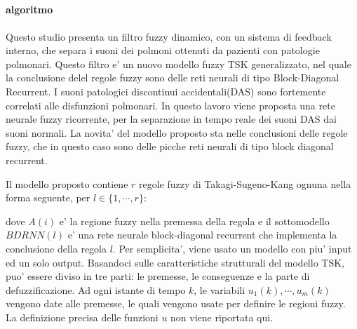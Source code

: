  

\subsection{\cite{ADFMFPLS}}

\paragraph{algoritmo}
Questo studio presenta un filtro fuzzy dinamico, con un sistema di feedback interno, che separa i suoni dei polmoni ottenuti da pazienti con patologie polmonari. Questo filtro e' un nuovo modello fuzzy TSK generalizzato, nel quale la conclusione delel regole fuzzy sono delle reti neurali di tipo Block-Diagonal Recurrent. I suoni patologici discontinui accidentali(DAS) sono fortemente correlati alle disfunzioni polmonari. In questo lavoro viene proposta una rete neurale fuzzy ricorrente, per la separazione in tempo reale dei suoni DAS dai suoni normali. La novita' del modello proposto sta nelle conclusioni delle regole fuzzy, che in questo caso sono delle picche reti neurali di tipo block diagonal recurrent. 

Il modello proposto contiene $r$ regole fuzzy di Takagi-Sugeno-Kang ognuna nella forma seguente, per $l\in\{1,\cdots, r\}$:

 \incmargin{1em}
 \linesnumbered
\begin{algorithm}
 \label{fuzzyrecurrenteneuralnetworkrule}
\end{algorithm}
 \decmargin{1em}

dove $A(i)$ e' la regione fuzzy nella premessa della regola e il sottomodello $BDRNN(l)$ e' una rete neurale block-diagonal recurrent che implementa la conclusione della regola $l$. Per semplicita', viene usato un modello con piu' input ed un solo output. Basandoci sulle caratteristiche strutturali del modello TSK, puo' essere diviso in tre parti: le premesse, le conseguenze e la parte di defuzzificazione. Ad ogni istante di tempo $k$, le variabili $u_{1}(k), \cdots, u_{m}(k)$ vengono date alle premesse, le quali vengono usate per definire le regioni fuzzy. La definizione precisa delle funzioni $u$ non viene riportata qui. 


